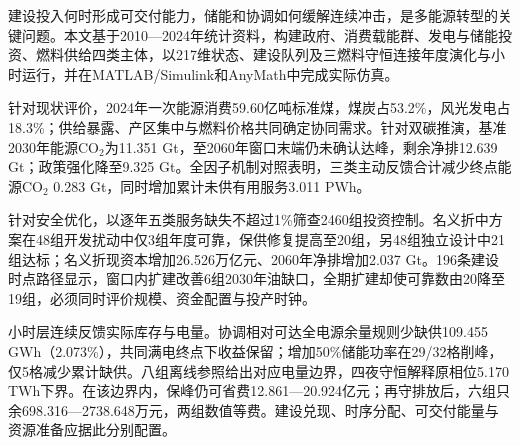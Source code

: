 建设投入何时形成可交付能力，储能和协调如何缓解连续冲击，是多能源转型的关键问题。本文基于2010—2024年统计资料，构建政府、消费载能群、发电与储能投资、燃料供给四类主体，以217维状态、建设队列及三燃料守恒连接年度演化与小时运行，并在MATLAB/Simulink和AnyMath中完成实际仿真。

针对现状评价，2024年一次能源消费59.60亿吨标准煤，煤炭占53.2\%，风光发电占18.3\%；供给暴露、产区集中与燃料价格共同确定协同需求。针对双碳推演，基准2030年能源CO$_2$为11.351 Gt，至2060年窗口末端仍未确认达峰，剩余净排12.639 Gt；政策强化降至9.325 Gt。全因子机制对照表明，三类主动反馈合计减少终点能源CO$_2$ 0.283 Gt，同时增加累计未供有用服务3.011 PWh。

针对安全优化，以逐年五类服务缺失不超过1\%筛查2460组投资控制。名义折中方案在48组开发扰动中仅3组年度可靠，保供修复提高至20组，另48组独立设计中21组达标；名义折现资本增加26.526万亿元、2060年净排增加2.037 Gt。196条建设时点路径显示，窗口内扩建改善6组2030年油缺口，全期扩建却使可靠数由20降至19组，必须同时评价规模、资金配置与投产时钟。

小时层连续反馈实际库存与电量。协调相对可达全电源余量规则少缺供109.455 GWh（2.073\%），共同满电终点下收益保留；增加50\%储能功率在29/32格削峰，仅5格减少累计缺供。八组离线参照给出对应电量边界，四夜守恒解释原相位5.170 TWh下界。在该边界内，保峰仍可省费12.861—20.924亿元；再守排放后，六组只余698.316—2738.648万元，两组数值等费。建设兑现、时序分配、可交付能量与资源准备应据此分别配置。
